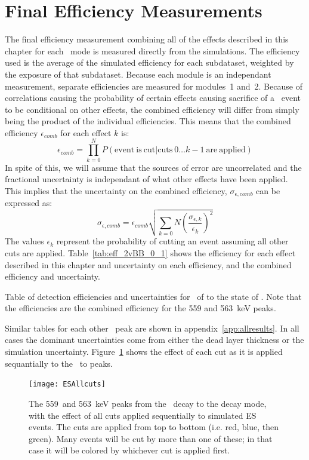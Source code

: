 \documentclass[/main.tex]{subfiles}
\begin{document}
\section{Final Efficiency Measurements}
The final efficiency measurement combining all of the effects described in this chapter for each \bbes\ mode is measured directly from the simulations.
The efficiency used is the average of the simulated efficiency for each subdataset, weighted by the exposure of that subdataset.
Because each module is an independant measurement, separate efficiencies are measured for modules~1 and~2.
Because of correlations causing the probability of certain effects causing sacrifice of a \bbes\ event to be conditional on other effects, the combined efficiency will differ from simply being the product of the individual efficiencies.
This means that the combined efficiency $\epsilon_{comb}$ for each effect $k$ is:
\begin{equation}
  \epsilon_{comb} = \prod_{k=0}^N P(\mathrm{event~is~cut} | \mathrm{cuts~} 0\dots k-1 \mathrm{~are~applied})
\end{equation}
In spite of this, we will assume that the sources of error are uncorrelated and the fractional uncertainty is independant of what other effects have been applied.
This implies that the uncertainty on the combined efficiency, $\sigma_{\epsilon,comb}$ can be expressed as:
\begin{equation}
  \sigma_{\epsilon,comb}=\epsilon_{comb} \sqrt{ \sum_{k=0}{N} (\frac{\sigma_{\epsilon,k}}{\epsilon_k})^2 }
\end{equation}
The values $\epsilon_k$ represent the probability of cutting an event assuming all other cuts are applied.
Table~\ref{tab:eff_2vBB_0_1} shows the efficiency for each effect described in this chapter and uncertainty on each efficiency, and the combined efficiency and uncertainty.
\begin{table}[h]
  \centering
  
  \caption[Detection efficiency summary for \tnbb\ to the  state of ]{\label{tab:eff_2vBB_0_1}
    Table of detection efficiencies and uncertainties for \tnbb\ of  to the  state of . Note that the efficiencies are the combined efficiency for the 559 and 563~keV peaks.
  }
\end{table}
Similar tables for each other \bbes\ peak are shown in appendix~\ref{app:allresults}.
In all cases the dominant uncertainties come from either the dead layer thickness or the simulation uncertainty.
Figure~\ref{fig:escuteffects} shows the effect of each cut as it is applied sequantially to the \tnbb\ to  peaks.
\begin{figure}[htb]
  \centering
  \texttt{[image: ESAllcuts]}
  \caption[Simulated \tnbb to  peaks with cuts applied]{\label{fig:escuteffects}
    The 559~and 563~keV peaks from the \tnbb\ decay to the  decay mode, with the effect of all cuts applied sequentially to simulated ES events. The cuts are applied from top to bottom (i.e. red, blue, then green). Many events will be cut by more than one of these; in that case it will be colored by whichever cut is applied first. 
  }
\end{figure}
\end{document}
